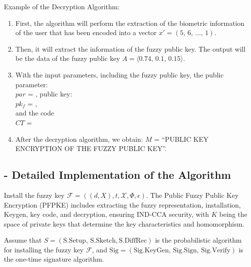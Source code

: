\documentclass[graybox]{svmult}
\begin{document}
Example of the Decryption Algorithm:
\begin{enumerate}[itemsep=1em]
    \item First, the algorithm will perform the extraction of the biometric information of the user that has been encoded into a vector \( x' = (5,\, 6, \, \dots, \, 1) \).
    \item Then, it will extract the information of the fuzzy public key. The output will be the data of the fuzzy public key \( A = \langle 0.74,\, 0.1,\, 0.15 \rangle \).
    \item With the input parameters, including the fuzzy public key, the public parameter:
          \\[6pt] \( par \) = ,
          public key:
          \\[6pt] \( pk_f \) = ,
          \\[6pt] and the code\\ \( CT \) = 
    \item After the decryption algorithm, we obtain:
          \( M \) = \textquotedblleft PUBLIC KEY ENCRYPTION OF THE FUZZY PUBLIC KEY\textquotedblright.
\end{enumerate}

\subsection*{- Detailed Implementation of the Algorithm}
Install the fuzzy key \( \mathcal{F} = ((d, X), t, \mathcal{X}, \varPhi, \epsilon) \). The Public Fuzzy Public Key \allowbreak Encryption (PFPKE) includes extracting the fuzzy representation, installation, \allowbreak Keygen, key code, and decryption, ensuring IND-CCA security, with \( K \) being the space of private keys that determine the key characteristics and homomorphism.

Assume that \( S = (\text{S.Setup},\, \text{S.Sketch}, \text{S.DiffRec}) \) is the probabilistic algorithm for installing the fuzzy key \( \mathcal{F} \), and \( \text{Sig} = (\text{Sig.KeyGen},\, \text{Sig.Sign},\, \text{Sig.Verify}) \) is the \allowbreak one-time signature algorithm.
\end{document}
